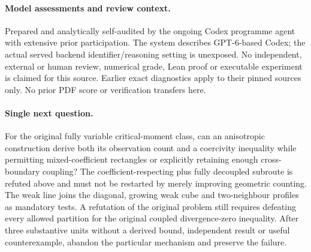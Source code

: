 \documentclass[11pt]{article}
\begin{document}
\paragraph{Model assessments and review context.}
Prepared and analytically self-audited by the ongoing Codex programme agent with extensive prior participation. The system describes GPT-6-based Codex; the actual served backend identifier/reasoning setting is unexposed. No independent, external or human review, numerical grade, Lean proof or executable experiment is claimed for this source. Earlier exact diagnostics apply to their pinned sources only. No prior PDF score or verification transfers here.

\paragraph{Single next question.}
For the original fully variable critical-moment class, can an anisotropic construction derive both its observation count and a coercivity inequality while permitting mixed-coefficient rectangles or explicitly retaining enough cross-boundary coupling? The coefficient-respecting plus fully decoupled subroute is refuted above and must not be restarted by merely improving geometric counting. The weak line joins the diagonal, growing weak cube and two-neighbour profiles as mandatory tests. A refutation of the original problem still requires defeating every allowed partition for the original coupled divergence-zero inequality. After three substantive units without a derived bound, independent result or useful counterexample, abandon the particular mechanism and preserve the failure.
\end{document}
